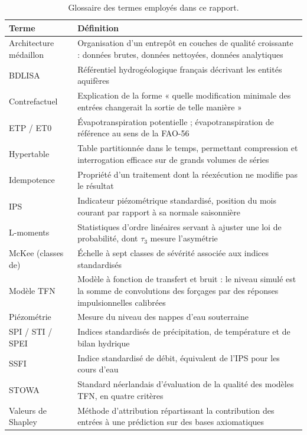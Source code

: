 \begin{table}[H]
\centering
\caption{Glossaire des termes employés dans ce rapport.}
\label{tab:glossaire}
\begin{tabularx}{\textwidth}{@{}lX@{}}
\toprule
\textbf{Terme} & \textbf{Définition} \\
\midrule
Architecture médaillon & Organisation d'un entrepôt en couches de qualité croissante : données
brutes, données nettoyées, données analytiques \\
BDLISA & Référentiel hydrogéologique français décrivant les entités aquifères \\
Contrefactuel & Explication de la forme « quelle modification minimale des entrées changerait
la sortie de telle manière » \\
ETP / ET0 & Évapotranspiration potentielle ; évapotranspiration de référence au sens de la
FAO-56 \\
Hypertable & Table partitionnée dans le temps, permettant compression et interrogation efficace
sur de grands volumes de séries \\
Idempotence & Propriété d'un traitement dont la réexécution ne modifie pas le résultat \\
IPS & Indicateur piézométrique standardisé, position du mois courant par rapport à sa normale
saisonnière \\
L-moments & Statistiques d'ordre linéaires servant à ajuster une loi de probabilité, dont
$\tau_3$ mesure l'asymétrie \\
McKee (classes de) & Échelle à sept classes de sévérité associée aux indices standardisés \\
Modèle TFN & Modèle à fonction de transfert et bruit : le niveau simulé est la somme de
convolutions des forçages par des réponses impulsionnelles calibrées \\
Piézométrie & Mesure du niveau des nappes d'eau souterraine \\
SPI / STI / SPEI & Indices standardisés de précipitation, de température et de bilan hydrique \\
SSFI & Indice standardisé de débit, équivalent de l'IPS pour les cours d'eau \\
STOWA & Standard néerlandais d'évaluation de la qualité des modèles TFN, en quatre critères \\
Valeurs de Shapley & Méthode d'attribution répartissant la contribution des entrées à une
prédiction sur des bases axiomatiques \\
\bottomrule
\end{tabularx}
\end{table}
